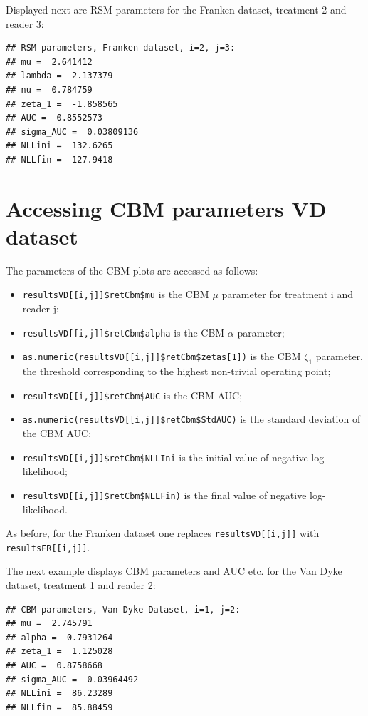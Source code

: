 \documentclass[
]{book}
\providecommand{\tightlist}{%
  \setlength{\itemsep}{0pt}\setlength{\parskip}{0pt}}
\begin{document}
Displayed next are RSM parameters for the Franken dataset, treatment 2 and reader 3:

\begin{verbatim}
## RSM parameters, Franken dataset, i=2, j=3: 
## mu =  2.641412 
## lambda =  2.137379 
## nu =  0.784759 
## zeta_1 =  -1.858565 
## AUC =  0.8552573 
## sigma_AUC =  0.03809136 
## NLLini =  132.6265 
## NLLfin =  127.9418
\end{verbatim}

\hypertarget{rsm-3-fits-cbm-parameters}{%
\section{Accessing CBM parameters VD dataset}\label{rsm-3-fits-cbm-parameters}}

The parameters of the CBM plots are accessed as follows:

\begin{itemize}
\tightlist
\item
  \texttt{resultsVD{[}{[}i,j{]}{]}\$retCbm\$mu} is the CBM \(\mu\) parameter for treatment i and reader j;
\item
  \texttt{resultsVD{[}{[}i,j{]}{]}\$retCbm\$alpha} is the CBM \(\alpha\) parameter;\\
\item
  \texttt{as.numeric(resultsVD{[}{[}i,j{]}{]}\$retCbm\$zetas{[}1{]})} is the CBM \(\zeta_1\) parameter, the threshold corresponding to the highest non-trivial operating point;
\item
  \texttt{resultsVD{[}{[}i,j{]}{]}\$retCbm\$AUC} is the CBM AUC;
\item
  \texttt{as.numeric(resultsVD{[}{[}i,j{]}{]}\$retCbm\$StdAUC)} is the standard deviation of the CBM AUC;
\item
  \texttt{resultsVD{[}{[}i,j{]}{]}\$retCbm\$NLLIni} is the initial value of negative log-likelihood;
\item
  \texttt{resultsVD{[}{[}i,j{]}{]}\$retCbm\$NLLFin)} is the final value of negative log-likelihood.
\end{itemize}

As before, for the Franken dataset one replaces \texttt{resultsVD{[}{[}i,j{]}{]}} with \texttt{resultsFR{[}{[}i,j{]}{]}}.

The next example displays CBM parameters and AUC etc. for the Van Dyke dataset, treatment 1 and reader 2:

\begin{verbatim}
## CBM parameters, Van Dyke Dataset, i=1, j=2: 
## mu =  2.745791 
## alpha =  0.7931264 
## zeta_1 =  1.125028 
## AUC =  0.8758668 
## sigma_AUC =  0.03964492 
## NLLini =  86.23289 
## NLLfin =  85.88459
\end{verbatim}
\end{document}
